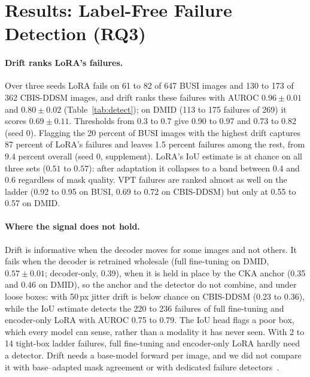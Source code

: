 \section{Results: Label-Free Failure Detection (RQ3)}
\label{sec:res_detect}

\begin{table}[tbp]
  \centering
  \caption{AUROC for detecting per-image failures (Dice below 0.5) at tight boxes, mean $\pm$ std over three seeds (single value: seed 0 only): decoder drift (Eq.~\eqref{eq:drift}) versus the decoder's IoU estimate. Cells with fewer than 20 failures omitted; drift is zero by construction for zero-shot. AUPRC, per-seed values and the 50\,px table are in the supplement.}
  \label{tab:detect}
  \resizebox{\linewidth}{!}{}
\end{table}

\paragraph{Drift ranks LoRA's failures.}
Over three seeds LoRA fails on 61 to 82 of 647 BUSI images and 130 to 173 of 362 CBIS-DDSM images, and drift ranks these failures with AUROC $0.96 \pm 0.01$ and $0.80 \pm 0.02$ (Table~\ref{tab:detect}); on DMID (113 to 175 failures of 269) it scores $0.69 \pm 0.11$. Thresholds from 0.3 to 0.7 give 0.90 to 0.97 and 0.73 to 0.82 (seed 0). Flagging the 20 percent of BUSI images with the highest drift captures 87 percent of LoRA's failures and leaves 1.5 percent failures among the rest, from 9.4 percent overall (seed 0, supplement). LoRA's IoU estimate is at chance on all three sets ($0.51$ to $0.57$): after adaptation it collapses to a band between 0.4 and 0.6 regardless of mask quality. VPT failures are ranked almost as well on the ladder (0.92 to 0.95 on BUSI, 0.69 to 0.72 on CBIS-DDSM) but only at 0.55 to 0.57 on DMID.

\paragraph{Where the signal does not hold.}
Drift is informative when the decoder moves for some images and not others. It fails when the decoder is retrained wholesale (full fine-tuning on DMID, $0.57 \pm 0.01$; decoder-only, 0.39), when it is held in place by the CKA anchor (0.35 and 0.46 on DMID), so the anchor and the detector do not combine, and under loose boxes: with 50\,px jitter drift is below chance on CBIS-DDSM (0.23 to 0.36), while the IoU estimate detects the 220 to 236 failures of full fine-tuning and encoder-only LoRA with AUROC 0.75 to 0.79. The IoU head flags a poor box, which every model can sense, rather than a modality it has never seen. With 2 to 14 tight-box ladder failures, full fine-tuning and encoder-only LoRA hardly need a detector. Drift needs a base-model forward per image, and we did not compare it with base--adapted mask agreement or with dedicated failure detectors~\cite{zenk2024failure,valindria2017rca}.
